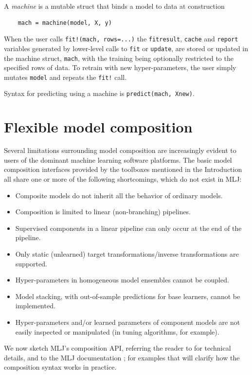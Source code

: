 \documentclass{article}
\begin{document}
A \textit{machine} is a mutable struct that binds a model to data at construction

\begin{verbatim}
    mach = machine(model, X, y)    
\end{verbatim}

When the user calls \texttt{fit!(mach, rows=...)} the \texttt{fitresult}, \texttt{cache} and \texttt{report} variables generated by lower-level calls to \texttt{fit} or \texttt{update}, are stored or updated in the machine struct, \texttt{mach}, with the training being optionally restricted to the specified rows of data. To retrain with new hyper-parameters, the user simply mutates
\texttt{model} and repeats the \texttt{fit!} call.

Syntax for predicting using a machine is \texttt{predict(mach, Xnew)}.

\section{Flexible model composition}

Several limitations surrounding model composition are increasingly evident to users of the dominant machine learning software platforms. The basic model composition interfaces provided by the toolboxes mentioned in the Introduction all share one or more of the following shortcomings, which do not exist in MLJ:

\begin{itemize}
    \item Composite models do not inherit all the behavior of ordinary models.
  \item Composition is limited to linear (non-branching) pipelines.
  \item Supervised components in a linear pipeline can only occur at the end of the pipeline.
  \item Only static (unlearned) target transformations/inverse transformations are supported.
  \item Hyper-parameters in homogeneous model ensembles cannot be coupled.
  \item Model stacking, with out-of-sample predictions for base learners, cannot be implemented.
  \item Hyper-parameters and/or learned parameters of component models are not easily inspected or manipulated (in tuning algorithms, for example).
\end{itemize}

We now sketch MLJ's composition API, referring the reader to \cite{Blaom_I} for technical details, and to the MLJ documentation \cite{MLJdocs}; \cite{MLJtutorials} for examples that will clarify how the composition syntax works in practice.
\end{document}
